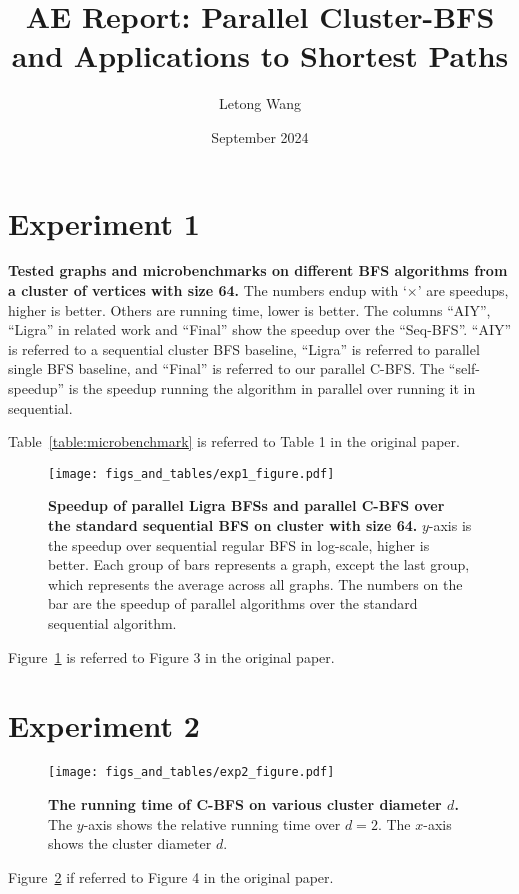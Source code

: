 \documentclass{article}
\title{AE Report: Parallel Cluster-BFS and Applications to Shortest Paths}
\author{Letong Wang}
\date{September 2024}
\begin{document}
\maketitle

\section{Experiment 1}
\begin{table}[htbp]
  \centering
  \footnotesize
  
  \caption{\small\textbf{
    Tested graphs and microbenchmarks on different BFS algorithms from a cluster of vertices with size 64. 
  }
  The numbers endup with `$\times$' are speedups, higher is better. Others are running time, lower is better. The columns ``AIY'', ``Ligra'' in related work and ``Final'' show the speedup over the ``Seq-BFS''. ``AIY'' is referred to a sequential cluster BFS baseline, ``Ligra'' is referred to parallel single BFS baseline, and ``Final'' is referred to our parallel C-BFS.  The ``self-speedup'' is the speedup running the algorithm in parallel over running it in sequential. 
  \label{table:microbenchmark}
  }
\end{table}
Table~\ref{table:microbenchmark} is referred to Table 1 in the original paper.

\begin{figure}[htbp]
  \centering
  \texttt{[image: figs\_and\_tables/exp1\_figure.pdf]}
  \caption{\small\textbf{Speedup of parallel Ligra BFSs and parallel C-BFS over the standard sequential BFS on cluster with size 64.} $y$-axis is the speedup over sequential regular BFS in log-scale, higher is better. Each group of bars represents a graph, except the last group, which represents the average across all graphs. The numbers on the bar are the speedup of parallel algorithms over the standard sequential algorithm.  
  \label{fig:par_compare}
  }
\end{figure} 
Figure~\ref{fig:par_compare} is referred to Figure 3 in the original paper.

\section{Experiment 2}
\begin{figure}[htbp]
  \centering
  \texttt{[image: figs\_and\_tables/exp2\_figure.pdf]}
  \caption{\small \textbf{The running time of C-BFS on various cluster diameter $d$.}
  The $y$-axis shows the relative running time over $d=2$. The $x$-axis shows the cluster diameter $d$. 
  }
  \label{fig:ccbfs_d}
\end{figure} 
Figure~\ref{fig:ccbfs_d} if referred to Figure 4 in the original paper.
\end{document}
